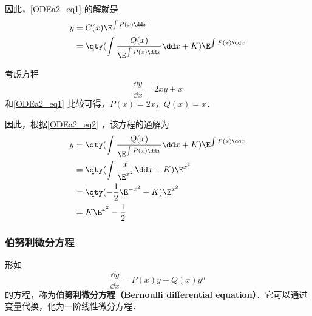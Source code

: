 因此，\autoref{ODEa2_eq1} 的解就是
\begin{equation}\label{ODEa2_eq2}
\begin{aligned}
y&=C(x)\E^{\int P(x)\dd x}\\
&=\qty(\int\frac{Q(x)}{\E^{\int P(x)\dd x}}\dd x+K)\E^{\int P(x)\dd x}
\end{aligned}
\end{equation}

\begin{example}{}
考虑方程
\begin{equation}
\frac{\dd y}{\dd x}=2xy+x
\end{equation}
和\autoref{ODEa2_eq1} 比较可得，$P(x)=2x$，$Q(x)=x$．

因此，根据\autoref{ODEa2_eq2} ，该方程的通解为
\begin{equation}
\begin{aligned}
y&=\qty(\int\frac{Q(x)}{\E^{\int P(x)\dd x}}\dd x+K)\E^{\int P(x)\dd x}\\
&=\qty(\int\frac{x}{\E^{x^2}}\dd x+K)\E^{x^2}\\
&=\qty(-\frac{1}{2}\E^{-x^2}+K)\E^{x^2}\\
&=K\E^{x^2}-\frac{1}{2}
\end{aligned}
\end{equation}
\end{example}

\subsubsection{伯努利微分方程}
形如
\begin{equation}
\frac{\dd y}{\dd x}=P(x)y+Q(x)y^n
\end{equation}
的方程，称为\textbf{伯努利微分方程（Bernoulli differential equation）}．它可以通过变量代换，化为一阶线性微分方程．



















